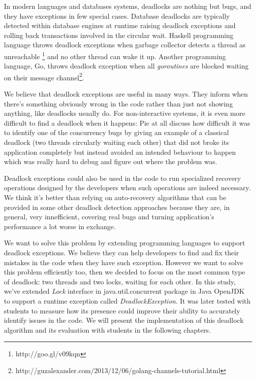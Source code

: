 In modern languages and databases systems, deadlocks are nothing but bugs, and they have exceptions in few special cases.
Database deadlocks are typically detected within database engines at runtime \cite{grechanik} raising deadlock exceptions and rolling back transactions
involved in the circular wait. Haskell programming language throws deadlock exceptions when garbage collector detects a thread as unreachable \footnote{http://goo.gl/v09kqn}
and no other thread can wake it up. Another programming language, Go, throws deadlock exception when all \emph{goroutines} are blocked waiting on their message channel\footnote{http://guzalexander.com/2013/12/06/golang-channels-tutorial.html}.

We believe that deadlock exceptions are useful in many ways. They inform when there's something obviously wrong in the code rather than just not showing anything,
like deadlocks usually do. For non-interactive systems, it is even more difficult to find a deadlock when it happens: Pie at all \cite{ian} discuss how difficult it
was to identify one of the concurrency bugs by giving an example of a classical deadlock (two threads circularly waiting each other) that did not
broke its application completely but instead avoided an intended behaviour to happen which was really hard to debug and figure out where the problem was.

Deadlock exceptions could also be used in the code to run specialized recovery operations designed by the developers when such operations are indeed necessary.
We think it's better than relying on auto-recovery algorithms that can be provided in some other deadlock detection approaches because they are, in general,
very innefficient, covering real bugs and turning application's performance a lot worse in exchange.

We want to solve this problem by extending programming languages to support deadlock exceptions. We believe they can help developers to find and fix their mistakes
in the code when they have such exception. However we want to solve this problem efficiently too, then we decided to focus on the most common type of deadlock:
two threads and two locks, waiting for each other. In this study, we've extended \emph{Lock} interface in java.util.concurrent package in Java OpenJDK to support
a runtime exception called \emph{DeadlockException}. It was later tested with students to measure how its presence could improve their ability to accurately identify issues in the code.
We will present the implementation of this deadlock algorithm and its evaluation with students in the following chapters.
